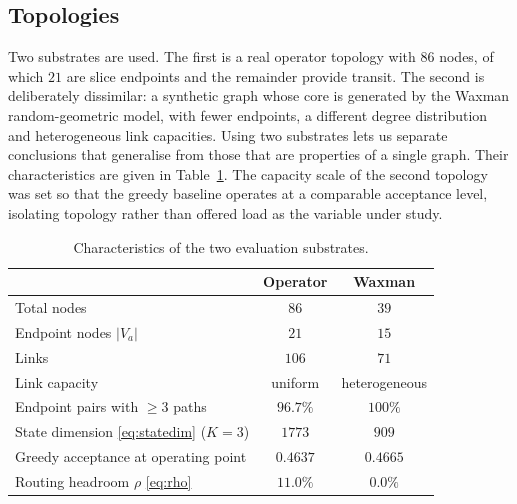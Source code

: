 \documentclass[10pt,journal,comsoc]{IEEEtran}
\begin{document}
\subsection{Topologies}
Two substrates are used. The first is a real operator topology with $86$
nodes, of which $21$ are slice endpoints and the remainder provide
transit. The second is deliberately dissimilar: a synthetic graph whose
core is generated by the Waxman random-geometric model, with fewer
endpoints, a different degree distribution and heterogeneous link
capacities. Using two substrates lets us separate conclusions that
generalise from those that are properties of a single graph. Their
characteristics are given in Table~\ref{tab:topologies}. The capacity
scale of the second topology was set so that the greedy baseline operates
at a comparable acceptance level, isolating topology rather than offered
load as the variable under study.

\begin{table}[t]
\centering
\caption{Characteristics of the two evaluation substrates.}
\label{tab:topologies}
\renewcommand{\arraystretch}{1.15}
\begin{tabular}{lcc}
\toprule
& \textbf{Operator} & \textbf{Waxman} \\
\midrule
Total nodes                       & $86$    & $39$ \\
Endpoint nodes $|V_a|$            & $21$    & $15$ \\
Links                             & $106$   & $71$ \\
Link capacity                     & uniform & heterogeneous \\
Endpoint pairs with $\geq 3$ paths & $96.7\%$ & $100\%$ \\
State dimension \eqref{eq:statedim} ($K{=}3$) & $1773$ & $909$ \\
Greedy acceptance at operating point & $0.4637$ & $0.4665$ \\
Routing headroom $\rho$ \eqref{eq:rho} & $\mathbf{11.0\%}$ & $\mathbf{0.0\%}$ \\
\bottomrule
\end{tabular}
\end{table}
\end{document}
